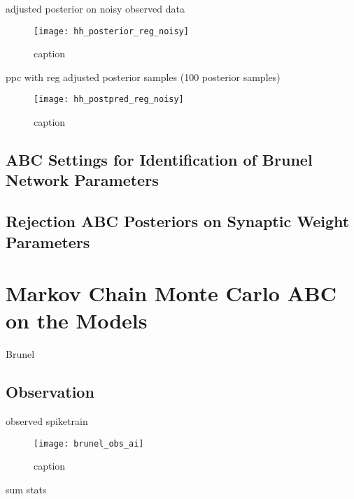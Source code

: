 adjusted posterior on noisy observed data

\begin{figure}[H]
    \centering
    \texttt{[image: hh\_posterior\_reg\_noisy]}
    \caption{caption}
    \label{fig:fig1}
\end{figure} 

ppc with reg adjusted posterior samples (100 posterior samples)


\begin{figure}[H]
    \centering
    \texttt{[image: hh\_postpred\_reg\_noisy]}
    \caption{caption}
    \label{fig:fig1}
\end{figure}

\section{ABC Settings for Identification of Brunel Network Parameters}

\section{Rejection ABC Posteriors on Synaptic Weight Parameters}

\chapter{Markov Chain Monte Carlo ABC on the Models}

Brunel 

\section{Observation}

observed spiketrain 

\begin{figure}[H]
    \centering
    \texttt{[image: brunel\_obs\_ai]}
    \caption{caption}
    \label{fig:fig1}
\end{figure}

sum stats

